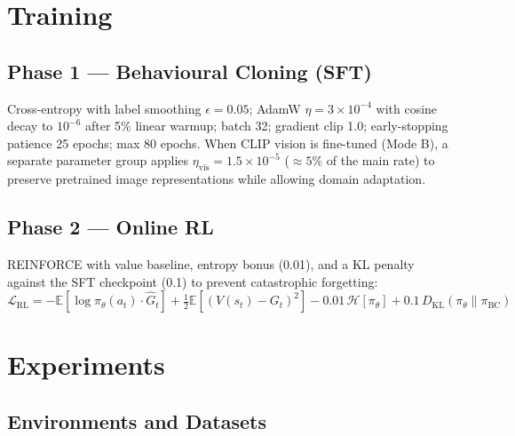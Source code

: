\documentclass{article}
\begin{document}
\section{Training}
\label{sec:training}

\subsection{Phase 1 — Behavioural Cloning (SFT)}
Cross-entropy with label smoothing $\epsilon{=}0.05$; AdamW $\eta{=}3{\times}10^{-4}$
with cosine decay to $10^{-6}$ after 5\% linear warmup; batch 32;
gradient clip 1.0; early-stopping patience 25 epochs; max 80 epochs.
When CLIP vision is fine-tuned (Mode B), a separate parameter group applies
$\eta_{\mathrm{vis}}{=}1.5{\times}10^{-5}$ ($\approx\!5\%$ of the main rate)
to preserve pretrained image representations while allowing domain adaptation.

\subsection{Phase 2 — Online RL}
REINFORCE with value baseline, entropy bonus (0.01), and a KL penalty
against the SFT checkpoint (0.1) to prevent catastrophic forgetting:
\begin{equation}
  \mathcal{L}_{\mathrm{RL}}
  = -\mathbb{E}[\log\pi_\theta(a_t)\cdot\hat{G}_t]
  + \tfrac{1}{2}\mathbb{E}[(V(s_t){-}G_t)^2]
  - 0.01\,\mathcal{H}[\pi_\theta]
  + 0.1\,D_{\mathrm{KL}}(\pi_\theta\|\pi_{\mathrm{BC}})
\end{equation}

\section{Experiments}
\label{sec:experiments}

\subsection{Environments and Datasets}
\end{document}
